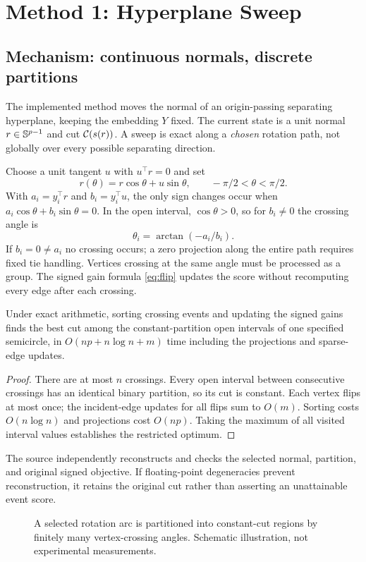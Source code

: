 \section{Method 1: Hyperplane Sweep}\label{sec:hyperplane}
\subsection{Mechanism: continuous normals, discrete partitions}
The implemented  method moves the normal of an origin-passing separating hyperplane, keeping the embedding $Y$ fixed. The current state is a unit normal $r\in\mathbb{S}^{p-1}$ and cut $\mathcal{C}(s(r))$. A sweep is exact along a \emph{chosen} rotation path, not globally over every possible separating direction.

Choose a unit tangent $u$ with $u^\top r=0$ and set
\begin{equation}\label{eq:arc}
r(\theta)=r\cos\theta+u\sin\theta,\qquad -\pi/2<\theta<\pi/2.
\end{equation}
With $a_i=y_i^\top r$ and $b_i=y_i^\top u$, the only sign changes occur when $a_i\cos\theta+b_i\sin\theta=0$. In the open interval, $\cos\theta>0$, so for $b_i\ne0$ the crossing angle is
\begin{equation}\label{eq:angle}
\theta_i=\arctan(-a_i/b_i).
\end{equation}
If $b_i=0\ne a_i$ no crossing occurs; a zero projection along the entire path requires fixed tie handling. Vertices crossing at the same angle must be processed as a group. The signed gain formula \eqref{eq:flip} updates the score without recomputing every edge after each crossing.

\begin{proposition}\label{prop:arc}
Under exact arithmetic, sorting crossing events and updating the signed gains finds the best cut among the constant-partition open intervals of one specified semicircle, in $O(np+n\log n+m)$ time including the projections and sparse-edge updates.
\end{proposition}
\begin{proof}
There are at most $n$ crossings. Every open interval between consecutive crossings has an identical binary partition, so its cut is constant. Each vertex flips at most once; the incident-edge updates for all flips sum to $O(m)$. Sorting costs $O(n\log n)$ and projections cost $O(np)$. Taking the maximum of all visited interval values establishes the restricted optimum.
\end{proof}
The source independently reconstructs and checks the selected normal, partition, and original signed objective. If floating-point degeneracies prevent reconstruction, it retains the original cut rather than asserting an unattainable event score.
\begin{figure}[tb]
\centering

\caption{A selected rotation arc is partitioned into constant-cut regions by finitely many vertex-crossing angles. Schematic illustration, not experimental measurements.}
\label{fig:events}
\end{figure}

